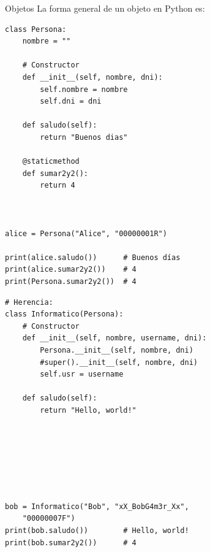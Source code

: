 \documentclass[10pt]{beamer} %
\begin{document}
\begin{frame}[fragile]{Objetos}
    La forma general de un objeto en Python es:
    \begin{multicols}{2}
        \begin{verbatim}
class Persona:
    nombre = ""
    
    # Constructor
    def __init__(self, nombre, dni):
        self.nombre = nombre
        self.dni = dni
    
    def saludo(self):
        return "Buenos dias"
    
    @staticmethod
    def sumar2y2():
        return 4



alice = Persona("Alice", "00000001R")

print(alice.saludo())      # Buenos días
print(alice.sumar2y2())    # 4
print(Persona.sumar2y2())  # 4

        \end{verbatim}
    \columnbreak
        \begin{verbatim}
# Herencia:
class Informatico(Persona):
    # Constructor
    def __init__(self, nombre, username, dni):
        Persona.__init__(self, nombre, dni)
        #super().__init__(self, nombre, dni)
        self.usr = username

    def saludo(self):
        return "Hello, world!"







bob = Informatico("Bob", "xX_BobG4m3r_Xx",
    "00000007F")
print(bob.saludo())        # Hello, world!
print(bob.sumar2y2())      # 4
        \end{verbatim}
    \end{multicols}
\end{frame}
\end{document}
